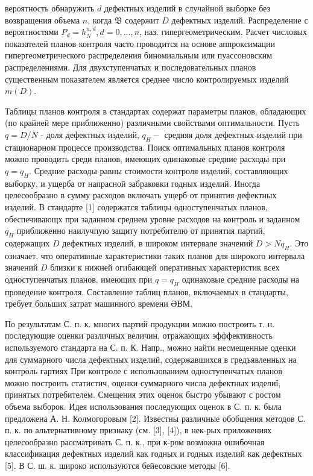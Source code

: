 \documentclass[10pt]{article}
\begin{document}
вероятность обнаружить $d$ дефектных изделий в случайной выборке без возвращения объема $n$, когда $\mathfrak{B}$ содержит $D$ дефектных изделий. Распределение с вероятностями $P_{d}=h_{N}^{n, d}, d=0, \ldots, n$, наз. гипергеометрическим. Расчет числовых показателей планов контроля часто проводится на основе аппроксимации гипергеометрического распределения биномиальным или пуассоновским распределениями. Для двухступенчатых и последовательных планов существенным показателем является среднее число контролируемых изделий $m(D)$.



Таблицы планов контроля в стандартах содержат параметры планов, обладающих (по крайней мере приближенно) различными свойствами оптимальности. Пусть $q=D / N$ - доля дефектных изделий, $q_{H}-$ средняя доля дефектных изделий при стационарном процессе производства. Поиск оптимальных планов контроля можно проводить среди планов, имеющих одинаковые средние расходы при $q=q_{H}$. Средние расходы равны стоимости контроля изделий, составляющих выборку, и ущерба от напрасной забраковки годных изделий. Иногда целесообразно в сумму расходов включать ущерб от принятия дефектных изделий. В стандарте [1] содержатся таблицы одноступенчатых планов, обеспечивающх при заданном среднем уровне расходов на контроль и заданном $q_{H}$ приближенно наилучпую защиту потребителю от принятия партий, содержащих $D$ дефектных изделий, в широком интервале значений $D>N q_{H}$. Это означает, что оперативные характеристики таких планов для широкого интервала значений $D$ близки к нижней огибающей оперативных характеристик всех одноступенчатых планов, имеющих при $q=q_{H}$ одинаковые средние расходы на проведение контроля. Составление таблиц планов, включаемых в стандарты, требует больших затрат машинного времени ӘВМ.



По результатам С. п. к. многих партий продукции можно построить т. н. последующие оценки различных величин, отражающих эфффективность используемого стандарта на С. п. К. Напр., можно найти несмещенные оденки для суммарного числа дефектных изделий, содержавшихся в гредъявленных на контроль гартиях При контроле с использованием одноступенчатых планов можно построить статистич, оценки суммарного числа дефектных изделиї, принятых потребителем. Смещения этих оценок быстро убывают с ростом объема выборок. Идея использования последующих оценок в С. п. к. была предложена А. Н. Колмогоровым [2]. Известны различные обобщения методов С. п. к. по альтернативному признаку (см. [3], [4]), в нек-рых приложениях целесообразно рассматривать С. п. к., при к-ром возможна ошибочная классификация дефектных изделий как годных и годных изделий как дефектных [5]. В С. ш. к. широко используются бейесовские методы [6].
\end{document}
